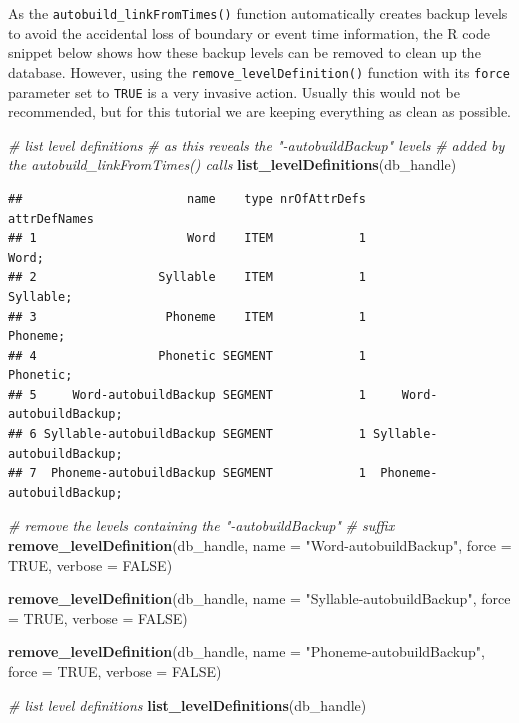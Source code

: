 \documentclass[]{book}
\newenvironment{Shaded}{\begin{snugshade}}{\end{snugshade}}
\newcommand{\CommentTok}[1]{\textcolor[rgb]{0.56,0.35,0.01}{\textit{#1}}}
\newcommand{\DataTypeTok}[1]{\textcolor[rgb]{0.13,0.29,0.53}{#1}}
\newcommand{\KeywordTok}[1]{\textcolor[rgb]{0.13,0.29,0.53}{\textbf{#1}}}
\newcommand{\NormalTok}[1]{#1}
\newcommand{\OtherTok}[1]{\textcolor[rgb]{0.56,0.35,0.01}{#1}}
\newcommand{\StringTok}[1]{\textcolor[rgb]{0.31,0.60,0.02}{#1}}
\begin{document}
As the \texttt{autobuild\_linkFromTimes()} function automatically creates backup levels to avoid the accidental loss of boundary or event time information, the R code snippet below shows how these backup levels can be removed to clean up the database. However, using the \texttt{remove\_levelDefinition()} function with its \texttt{force} parameter set to \texttt{TRUE} is a very invasive action. Usually this would not be recommended, but for this tutorial we are keeping everything as clean as possible.

\begin{Shaded}
\begin{Highlighting}[]
\CommentTok{# list level definitions}
\CommentTok{# as this reveals the "-autobuildBackup" levels}
\CommentTok{# added by the autobuild_linkFromTimes() calls}
\KeywordTok{list_levelDefinitions}\NormalTok{(db_handle)}
\end{Highlighting}
\end{Shaded}

\begin{verbatim}
##                       name    type nrOfAttrDefs              attrDefNames
## 1                     Word    ITEM            1                     Word;
## 2                 Syllable    ITEM            1                 Syllable;
## 3                  Phoneme    ITEM            1                  Phoneme;
## 4                 Phonetic SEGMENT            1                 Phonetic;
## 5     Word-autobuildBackup SEGMENT            1     Word-autobuildBackup;
## 6 Syllable-autobuildBackup SEGMENT            1 Syllable-autobuildBackup;
## 7  Phoneme-autobuildBackup SEGMENT            1  Phoneme-autobuildBackup;
\end{verbatim}

\begin{Shaded}
\begin{Highlighting}[]
\CommentTok{# remove the levels containing the "-autobuildBackup"}
\CommentTok{# suffix}
\KeywordTok{remove_levelDefinition}\NormalTok{(db_handle,}
                       \DataTypeTok{name =} \StringTok{"Word-autobuildBackup"}\NormalTok{,}
                       \DataTypeTok{force =} \OtherTok{TRUE}\NormalTok{,}
                       \DataTypeTok{verbose =} \OtherTok{FALSE}\NormalTok{)}

\KeywordTok{remove_levelDefinition}\NormalTok{(db_handle,}
                       \DataTypeTok{name =} \StringTok{"Syllable-autobuildBackup"}\NormalTok{,}
                       \DataTypeTok{force =} \OtherTok{TRUE}\NormalTok{,}
                       \DataTypeTok{verbose =} \OtherTok{FALSE}\NormalTok{)}

\KeywordTok{remove_levelDefinition}\NormalTok{(db_handle,}
                       \DataTypeTok{name =} \StringTok{"Phoneme-autobuildBackup"}\NormalTok{,}
                       \DataTypeTok{force =} \OtherTok{TRUE}\NormalTok{,}
                       \DataTypeTok{verbose =} \OtherTok{FALSE}\NormalTok{)}

\CommentTok{# list level definitions}
\KeywordTok{list_levelDefinitions}\NormalTok{(db_handle)}
\end{Highlighting}
\end{Shaded}
\end{document}
